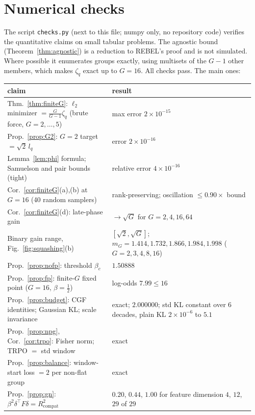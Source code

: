 \documentclass[11pt]{article}
\theoremstyle{definition}
\theoremstyle{remark}
\newcommand{\1}{\mathbb{1}}
\begin{document}
\section{Numerical checks}\label{app:checks}
The script \texttt{checks.py} (next to this file; numpy only, no repository code)
verifies the quantitative claims on small tabular problems. The agnostic bound
(Theorem~\ref{thm:agnostic}) is a reduction to REBEL's proof and is not simulated. Where possible it
enumerates groups exactly, using multisets of the $G-1$ other members, which makes
$\zeta_q$ exact up to $G=16$. All checks pass. The main ones:
\begin{center}\small
\begin{tabularx}{\textwidth}{@{}>{\raggedright\arraybackslash}X>{\raggedright\arraybackslash}p{6.2cm}@{}}
\toprule
claim & result \\
\midrule
Thm.~\ref{thm:finiteG}: $\ell_2$ minimizer $=\frac{G}{G-1}\zeta_q$ (brute force, $G=2,\dots,5$) & max error $2\times10^{-15}$\\
Prop.~\ref{prop:G2}: $G=2$ target $=\sqrt2\,l_q$ & error $2\times10^{-16}$\\
Lemma~\ref{lem:phi} formula; Samuelson and pair bounds (tight) & relative error $4\times10^{-16}$\\
Cor.~\ref{cor:finiteG}(a),(b) at $G=16$ (40 random samplers) & rank-preserving; oscillation $\le0.90\times$ bound\\
Cor.~\ref{cor:finiteG}(d): late-phase gain & $\to\sqrt G$ for $G=2,4,16,64$\\
Binary gain range, Fig.~\ref{fig:squashing}(b) & $[\sqrt2,\sqrt G]$; $m_G=1.414, 1.732, 1.866, 1.984, 1.998$ ($G=2,3,4,8,16$)\\
Prop.~\ref{prop:nofp}: threshold $\beta_c$ & $1.50888$\\
Prop.~\ref{prop:fp}: finite-$G$ fixed point ($G=16$, $\beta=\frac12$) & log-odds $7.99\le16$\\
Prop.~\ref{prop:budget}: CGF identities; Gaussian KL; scale invariance & exact; $2.000000$; std KL constant over 6 decades, plain KL $2\times10^{-6}$ to $5.1$\\
Prop.~\ref{prop:npg}, Cor.~\ref{cor:trpo}: Fisher norm; TRPO $=$ std window & exact\\
Prop.~\ref{prop:balance}: window-start loss $=2$ per non-flat group & exact\\
Prop.~\ref{prop:gn}: $\beta^2\delta^\top F\delta=R^2_{\mathrm{compat}}$ & $0.20$, $0.44$, $1.00$ for feature dimension $4$, $12$, $29$ of $29$\\

\end{tabularx}
\end{center}
\end{document}
